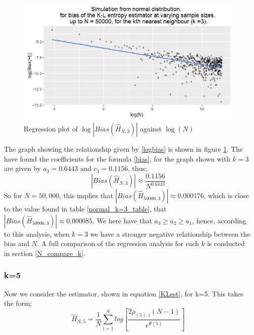 \documentclass{article}
\begin{document}
\begin{figure}
  \begin{center}
    \includegraphics[width=\textwidth]{./Graphs/Normal_k=3_plot.png}
  \end{center}
\caption{Regression plot of $\log|Bias(\hat{H}_{N, 3})|$ against $\log(N)$}
  \label{normal_k=3_graph}
\end{figure}

The graph showing the relationship given by \ref{logbias} is shown in figure \ref{normal_k=3_graph}. The have found the coefficients for the formula \ref{bias}, for the graph shown with $k=3$ are given by $a_{3} = 0.6443$ and $c_{3} = 0.1156$, thus;
\begin{equation}
|Bias(\hat{H}_{N, 3})| \approx \frac{0.1156}{N^{0.6443}} \nonumber
\end{equation}
So for $N=50,000$, this implies that $|Bias(\hat{H}_{50000, 3})| \approx 0.000176$, which is close to the value found in table \ref{normal_k=3_table}, that $|Bias(\hat{H}_{50000, 3})| \approx 0.000085$. We here have that $a_{3} \geq a_{2} \geq a_{1}$, hence, according to this analysis, when $k=3$ we have a stronger negative relationship between the bias and $N$. A full comparison of the regression analysis for each $k$ is conducted in section \ref{N_compare_k}.




\subsubsection{k=5} \label{N_k=5}
Now we consider the estimator, shown in equation \ref{KLest}, for k=5. This takes the form;
\begin{equation}
\hat{H}_{N, 5} = \frac{1}{N} \sum_{i=1}^{N} log \left[ \frac{2\rho_{(5),i}(N-1)}{e^{\Psi(5)}} \right] \nonumber
\end{equation}
\end{document}
